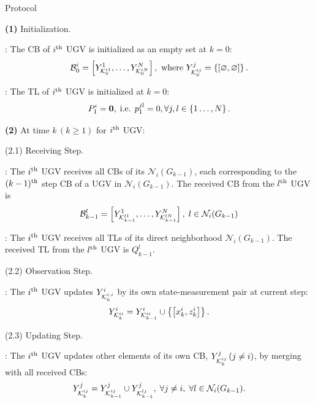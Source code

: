 	\begin{algorithm}
		\caption{{\proto} Protocol}
		\label{alg:lifo}
		\begin{algorithmic}
			\State \textbf{(1)} Initialization.
			
			\CB: 
			The CB of $i^\text{th}$ UGV is initialized as an empty set at $k=0$:
			\small\begin{equation*}
				{\mathcal{B}^i_0=\left[ Y^1_{\mathcal{K}^{i1}_{0}},\dots,Y^N_{\mathcal{K}^{iN}_{0}}\right], \text{ where } Y^j_{\mathcal{K}^{ij}_0} = \left\lbrace\left[ \varnothing,\varnothing\right]\right\rbrace.}
			\end{equation*}\normalsize
			
			\TL:
			The TL of $i^\text{th}$ UGV is initialized at $k=0$:
			\small\begin{equation*}
				P^i_1 = \mathbf{0},\;\text{i.e. } p^{jl}_1=0, \forall j,l\in \left\lbrace 1\dots,N\right\rbrace.
			\end{equation*}\normalsize
			
			\State \textbf{(2)} At time $k\,(k\geq 1)$ for $i^\text{th}$ UGV:	
			
			\State (2.1) Receiving Step.
			
			\CB:	The $i^\text{th}$ UGV receives all CBs of its {\dnbhd} $\mathcal{N}_i(G_{k-1})$,
			each corresponding to the $(k-1)^\text{th}$ step CB of a UGV in $\mathcal{N}_i(G_ {k-1})$. 
			The received CB from the $l^\text{th}$ UGV is
			\small\begin{equation*}
				\mathcal{B}^l_{k-1}=\left[Y^1_{\mathcal{K}^{l1}_{k-1}},\dots,Y^N_{\mathcal{K}^{lN}_{k-1}}\right],\; l\in\mathcal{N}_i(G_{k-1})
			\end{equation*}\normalsize
			
			\TL: The $i^\text{th}$ UGV receives all TLs of its direct neighborhood $\mathcal{N}_i(G_{k-1})$.
			The received TL from the $l^\text{th}$ UGV is $Q^l_{k-1}$.
			\newline
			
			\State (2.2) Observation Step.
			
			\CB: The $i^\text{th}$ UGV updates $Y^i_{\mathcal{K}^{i,i}_{k}}$ by its own state-measurement pair at current step:
			\small\begin{equation*}
			Y^i_{\mathcal{K}^{ii}_{k}} = Y^i_{\mathcal{K}^{ii}_{k-1}} \cup \left\lbrace{\left[x^i_k,z^i_k\right]}\right\rbrace.
			\end{equation*}\normalsize
						
			\State (2.3) Updating Step.
			
			\CB: The $i^\text{th}$ UGV updates other elements of its own CB, $Y^j_{\mathcal{K}^{ij}_{k}}\,(j\neq i)$, by merging with all received CBs:						
			\small\begin{equation*}
				Y^j_{\mathcal{K}^{ij}_{k}} = Y^j_{\mathcal{K}^{ij}_{k-1}} \cup Y^j_{\mathcal{K}^{lj}_{k-1}},
				\; \forall j\neq i,\;\forall l\in \mathcal{N}_i(G_{k-1}).
			\end{equation*}\normalsize
			

\end{algorithmic}
\end{algorithm}
